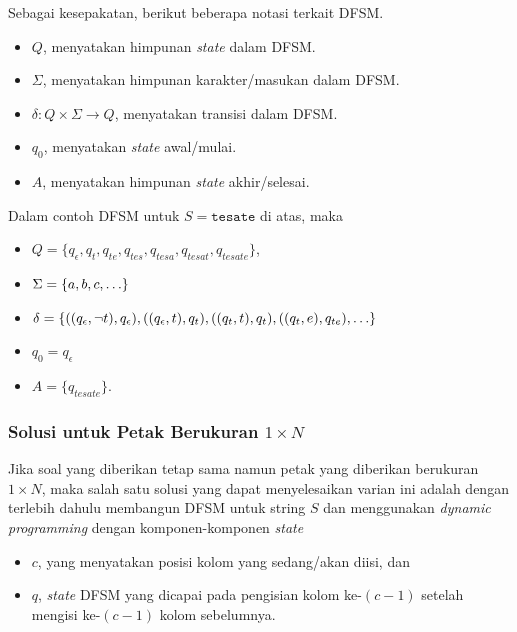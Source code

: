 \documentclass[../main_editorial.tex]{subfiles} %
\begin{document}
Sebagai kesepakatan, berikut beberapa notasi terkait DFSM.

\begin{itemize}
\item $ Q $, menyatakan himpunan \textit{state} dalam DFSM.
\item $ \Sigma $, menyatakan himpunan karakter/masukan dalam DFSM.
\item $ \delta : Q \times \Sigma \rightarrow Q $, menyatakan transisi dalam DFSM.
\item $ q_0 $, menyatakan \textit{state} awal/mulai.
\item $ A $, menyatakan himpunan \textit{state} akhir/selesai.
\end{itemize}

Dalam contoh DFSM untuk $ S = \texttt{tesate} $ di atas, maka

\begin{itemize}
\item
$ Q = \{q_\epsilon, q_t, q_{te}, q_{tes}, q_{tesa}, q_{tesat}, q_{tesate}\} $,
\item 
$ \Sigma = \{a, b, c, \mathellipsis\} $
\item
$ \delta = \{((q_\epsilon, \lnot t), q_\epsilon), ((q_\epsilon, t), q_t), ((q_t, t), q_t), ((q_t, e), q_{te}), \mathellipsis\} $
\item $ q_0 = q_\epsilon $
\item $ A = \{q_{tesate}\} $.
\end{itemize}

\subsubsection*{Solusi untuk Petak Berukuran $ 1 \times N $}

Jika soal yang diberikan tetap sama namun petak yang diberikan berukuran $ 1 \times N $, maka salah satu solusi yang dapat menyelesaikan varian ini adalah dengan terlebih dahulu membangun DFSM untuk string $ S $ dan menggunakan \textit{dynamic programming} dengan komponen-komponen \textit{state}

\begin{itemize}
\item $ c $, yang menyatakan posisi kolom yang sedang/akan diisi, dan
\item $ q $, \textit{state} DFSM yang dicapai pada pengisian kolom ke-$ (c-1) $ setelah mengisi ke-$ (c - 1) $ kolom sebelumnya.
\end{itemize}
\end{document}
